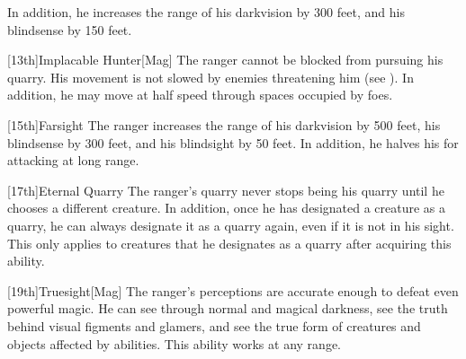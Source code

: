         In addition, he increases the range of his darkvision by 300 feet, and his blindsense by 150 feet.

        [13th]{Implacable Hunter}[Mag]
        The ranger cannot be blocked from pursuing his quarry.
        His movement is not slowed by enemies threatening him (see ).
        In addition, he may move at half speed through spaces occupied by foes.

        [15th]{Farsight}
        The ranger increases the range of his darkvision by 500 feet, his blindsense by 300 feet, and his blindsight by 50 feet.
        In addition, he halves his  for attacking at long range.

        [17th]{Eternal Quarry}
        The ranger's quarry never stops being his quarry until he chooses a different creature.
        In addition, once he has designated a creature as a quarry, he can always designate it as a quarry again, even if it is not in his sight.
        This only applies to creatures that he designates as a quarry after acquiring this ability.

        [19th]{Truesight}[Mag]
        The ranger's perceptions are accurate enough to defeat even powerful magic.
        He can see through normal and magical darkness, see the truth behind visual figments and glamers, and see the true form of creatures and objects affected by  abilities.
        This ability works at any range.

